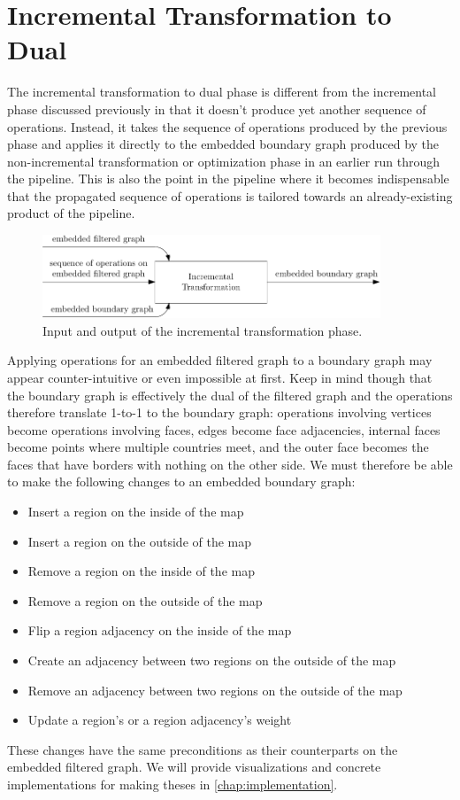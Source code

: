 \section{Incremental Transformation to Dual}
\label{sect:incremental-transformation-to-dual}

The incremental transformation to dual phase is different from the incremental phase discussed previously in that it doesn't produce yet another sequence of operations. Instead, it takes the sequence of operations produced by the previous phase and applies it directly to the embedded boundary graph produced by the non-incremental transformation or optimization phase in an earlier run through the pipeline. This is also the point in the pipeline where it becomes indispensable that the propagated sequence of operations is tailored towards an already-existing product of the pipeline.

\begin{figure}[H]
	\centering\includegraphics[width=0.9\textwidth]{Resources/DynamicPipeline-IncrementalTransformation.pdf}
	\caption{Input and output of the incremental transformation phase.}
	\label{fig:dynamic-pipeline-incremental-transformation}
\end{figure}

Applying operations for an embedded filtered graph to a boundary graph may appear counter-intuitive or even impossible at first. Keep in mind though that the boundary graph is effectively the dual of the filtered graph and the operations therefore translate 1-to-1 to the boundary graph: operations involving vertices become operations involving faces, edges become face adjacencies, internal faces become points where multiple countries meet, and the outer face becomes the faces that have borders with nothing on the other side. We must therefore be able to make the following changes to an embedded boundary graph:

\begin{itemize}
	\setlength\itemsep{-0.25em}
	\item Insert a region on the inside of the map
	\item Insert a region on the outside of the map
	\item Remove a region on the inside of the map
	\item Remove a region on the outside of the map
	\item Flip a region adjacency on the inside of the map
	\item Create an adjacency between two regions on the outside of the map
	\item Remove an adjacency between two regions on the outside of the map
	\item Update a region's or a region adjacency's weight
\end{itemize}

These changes have the same preconditions as their counterparts on the embedded filtered graph. We will provide visualizations and concrete implementations for making theses in \cref{chap:implementation}.
